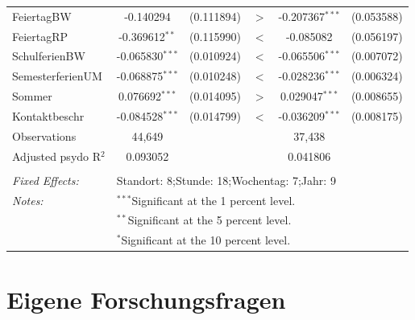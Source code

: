 \documentclass[a4paper,12pt]{thesis}
\begin{document}
\begin{table}[!htbp]
\begin{tabular}{@{\extracolsep{-5pt}}lccccc}
		FeiertagBW & -0.140294 & (0.111894) & $>$ & -0.207367$^{***}$ & (0.053588)\\ 
		
		FeiertagRP & -0.369612$^{**}$ & (0.115990) & $<$ & -0.085082 & (0.056197)\\ 
		
		SchulferienBW & -0.065830$^{***}$ & (0.010924) & $<$ & -0.065506$^{***}$ & (0.007072)\\ 
		
		SemesterferienUM & -0.068875$^{***}$ & (0.010248) & $<$ & -0.028236$^{***}$ & (0.006324)\\ 
		
		Sommer & 0.076692$^{***}$ & (0.014095) & $>$ & 0.029047$^{***}$ & (0.008655)\\ 
		
		Kontaktbeschr & -0.084528$^{***}$ & (0.014799) & $<$ & -0.036209$^{***}$ & (0.008175)\\ 
		
		Observations & 44,649 & & & 37,438 & \\ 
		Adjusted psydo R$^{2}$ & 0.093052 & & & 0.041806 & \\  
		\hline \\[-1.8ex] 
		\textit{Fixed Effects:} & \multicolumn{5}{l}{Standort: 8;Stunde: 18;Wochentag: 7;Jahr: 9} \\ 
		\textit{Notes:} & \multicolumn{5}{l}{$^{***}$Significant at the 1 percent level.} \\ 
		& \multicolumn{5}{l}{$^{**}$Significant at the 5 percent level.} \\ 
		& \multicolumn{5}{l}{$^{*}$Significant at the 10 percent level.} \\ 
	\end{tabular} 
\end{table} 


\chapter{Eigene Forschungsfragen}
\end{document}
